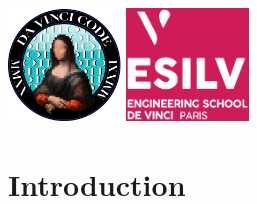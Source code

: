\documentclass[12pt]{article}
\begin{document}
    \backgroundpages
    \setlength{\columnsep}{-1cm}
    \begin{multicols}{2}\raggedbottom\color{white}
        \noindent
        \parbox[t][40mm][t]{\columnwidth}{\setlength{\parindent}{1em}
        \vspace*{-18mm}
        \includegraphics[height=30mm]{davincicode}
        \includegraphics[height=30mm]{esilv}
        }

        \noindent
        \parbox[c][40mm][c]{\columnwidth}{\setlength{\parindent}{0em}
        \shadowoffsetx{1pt}
        \shadowoffsety{0pt}
        \vspace*{-24mm}
        \vspace{0.5cm}
        }

    \end{multicols}
    \vspace*{-30mm}
    \raggedbottom
    \section{Introduction}
\end{document}
